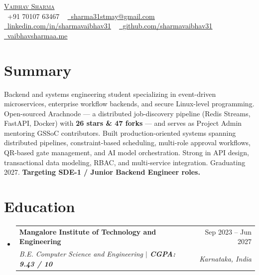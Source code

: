 \documentclass[letterpaper,10pt]{article}
\makeatletter
\newcommand{\resumeSubheading}[4]{
  \vspace{-2pt}\item
    \begin{tabular*}{0.97\textwidth}[t]{l@{\extracolsep{\fill}}r}
      \textbf{#1} & #2 \\
      \textit{\small#3} & \textit{\small #4} \\
    \end{tabular*}\vspace{-7pt}
}
\newcommand{\resumeSubHeadingListStart}{\begin{itemize}[leftmargin=0.15in, label={}]}
\newcommand{\resumeSubHeadingListEnd}{\end{itemize}}
\makeatother
\begin{document}
\begin{center}
  {\LARGE \scshape \href{https://vaibhavsharmaa.me}{Vaibhav Sharma}} \\ \vspace{3pt}
  \small
  \faPhone\ +91 70107 63467 ~
  \href{mailto:sharma31stmay@gmail.com}{\faEnvelope\ \underline{sharma31stmay@gmail.com}} ~
  \href{https://linkedin.com/in/sharmavaibhav31}{\faLinkedin\ \underline{linkedin.com/in/sharmavaibhav31}} ~
  \href{https://github.com/sharmavaibhav31}{\faGithub\ \underline{github.com/sharmavaibhav31}} ~
  \href{https://vaibhavsharmaa.me}{\faGlobe\ \underline{vaibhavsharmaa.me}}
\end{center}
\vspace{-6pt}

\section{Summary}
\small{Backend and systems engineering student specializing in event-driven microservices, enterprise workflow backends, and secure Linux-level programming. Open-sourced Arachnode — a distributed job-discovery pipeline (Redis Streams, FastAPI, Docker) with \textbf{26 stars \& 47 forks} — and serves as Project Admin mentoring GSSoC contributors. Built production-oriented systems spanning distributed pipelines, constraint-based scheduling, multi-role approval workflows, QR-based gate management, and AI model orchestration. Strong in API design, transactional data modeling, RBAC, and multi-service integration. Graduating 2027. \textbf{Targeting SDE-1 / Junior Backend Engineer roles.}}

\vspace{-2pt}

\section{Education}
\resumeSubHeadingListStart
  \resumeSubheading
    {Mangalore Institute of Technology and Engineering}{Sep 2023 -- Jun 2027}
    {B.E. Computer Science and Engineering $|$ \textbf{CGPA: 9.43 / 10}}{Karnataka, India}
\resumeSubHeadingListEnd
\vspace{-2pt}

\end{document}
